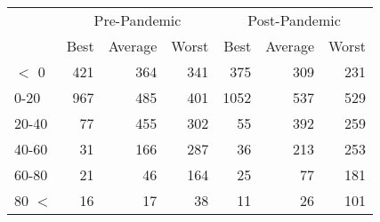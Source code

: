 
\begin{tabular}[t]{lrrrrrr}
\toprule
\multicolumn{1}{c}{ } & \multicolumn{3}{c}{Pre-Pandemic} & \multicolumn{3}{c}{Post-Pandemic} \\
\cmidrule(l{3pt}r{3pt}){2-4} \cmidrule(l{3pt}r{3pt}){5-7}
 & Best & Average & Worst & Best & Average & Worst\\
\midrule
$<$ 0 & 421 & 364 & 341 & 375 & 309 & 231\\
0-20 & 967 & 485 & 401 & 1052 & 537 & 529\\
20-40 & 77 & 455 & 302 & 55 & 392 & 259\\
40-60 & 31 & 166 & 287 & 36 & 213 & 253\\
60-80 & 21 & 46 & 164 & 25 & 77 & 181\\
80 $<$ & 16 & 17 & 38 & 11 & 26 & 101\\
\bottomrule
\end{tabular}

